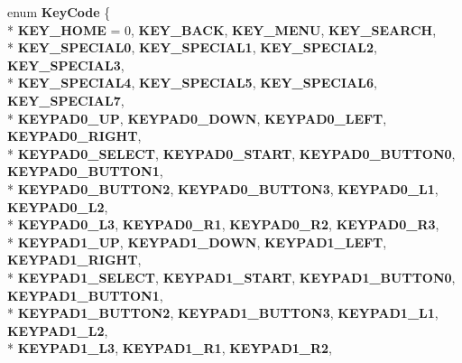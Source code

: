 \begin{DoxyCompactItemize}
\item 
enum {\bfseries Key\+Code} \{ \\*
{\bfseries K\+E\+Y\+\_\+\+H\+O\+ME} = 0, 
{\bfseries K\+E\+Y\+\_\+\+B\+A\+CK}, 
{\bfseries K\+E\+Y\+\_\+\+M\+E\+NU}, 
{\bfseries K\+E\+Y\+\_\+\+S\+E\+A\+R\+CH}, 
\\*
{\bfseries K\+E\+Y\+\_\+\+S\+P\+E\+C\+I\+A\+L0}, 
{\bfseries K\+E\+Y\+\_\+\+S\+P\+E\+C\+I\+A\+L1}, 
{\bfseries K\+E\+Y\+\_\+\+S\+P\+E\+C\+I\+A\+L2}, 
{\bfseries K\+E\+Y\+\_\+\+S\+P\+E\+C\+I\+A\+L3}, 
\\*
{\bfseries K\+E\+Y\+\_\+\+S\+P\+E\+C\+I\+A\+L4}, 
{\bfseries K\+E\+Y\+\_\+\+S\+P\+E\+C\+I\+A\+L5}, 
{\bfseries K\+E\+Y\+\_\+\+S\+P\+E\+C\+I\+A\+L6}, 
{\bfseries K\+E\+Y\+\_\+\+S\+P\+E\+C\+I\+A\+L7}, 
\\*
{\bfseries K\+E\+Y\+P\+A\+D0\+\_\+\+UP}, 
{\bfseries K\+E\+Y\+P\+A\+D0\+\_\+\+D\+O\+WN}, 
{\bfseries K\+E\+Y\+P\+A\+D0\+\_\+\+L\+E\+FT}, 
{\bfseries K\+E\+Y\+P\+A\+D0\+\_\+\+R\+I\+G\+HT}, 
\\*
{\bfseries K\+E\+Y\+P\+A\+D0\+\_\+\+S\+E\+L\+E\+CT}, 
{\bfseries K\+E\+Y\+P\+A\+D0\+\_\+\+S\+T\+A\+RT}, 
{\bfseries K\+E\+Y\+P\+A\+D0\+\_\+\+B\+U\+T\+T\+O\+N0}, 
{\bfseries K\+E\+Y\+P\+A\+D0\+\_\+\+B\+U\+T\+T\+O\+N1}, 
\\*
{\bfseries K\+E\+Y\+P\+A\+D0\+\_\+\+B\+U\+T\+T\+O\+N2}, 
{\bfseries K\+E\+Y\+P\+A\+D0\+\_\+\+B\+U\+T\+T\+O\+N3}, 
{\bfseries K\+E\+Y\+P\+A\+D0\+\_\+\+L1}, 
{\bfseries K\+E\+Y\+P\+A\+D0\+\_\+\+L2}, 
\\*
{\bfseries K\+E\+Y\+P\+A\+D0\+\_\+\+L3}, 
{\bfseries K\+E\+Y\+P\+A\+D0\+\_\+\+R1}, 
{\bfseries K\+E\+Y\+P\+A\+D0\+\_\+\+R2}, 
{\bfseries K\+E\+Y\+P\+A\+D0\+\_\+\+R3}, 
\\*
{\bfseries K\+E\+Y\+P\+A\+D1\+\_\+\+UP}, 
{\bfseries K\+E\+Y\+P\+A\+D1\+\_\+\+D\+O\+WN}, 
{\bfseries K\+E\+Y\+P\+A\+D1\+\_\+\+L\+E\+FT}, 
{\bfseries K\+E\+Y\+P\+A\+D1\+\_\+\+R\+I\+G\+HT}, 
\\*
{\bfseries K\+E\+Y\+P\+A\+D1\+\_\+\+S\+E\+L\+E\+CT}, 
{\bfseries K\+E\+Y\+P\+A\+D1\+\_\+\+S\+T\+A\+RT}, 
{\bfseries K\+E\+Y\+P\+A\+D1\+\_\+\+B\+U\+T\+T\+O\+N0}, 
{\bfseries K\+E\+Y\+P\+A\+D1\+\_\+\+B\+U\+T\+T\+O\+N1}, 
\\*
{\bfseries K\+E\+Y\+P\+A\+D1\+\_\+\+B\+U\+T\+T\+O\+N2}, 
{\bfseries K\+E\+Y\+P\+A\+D1\+\_\+\+B\+U\+T\+T\+O\+N3}, 
{\bfseries K\+E\+Y\+P\+A\+D1\+\_\+\+L1}, 
{\bfseries K\+E\+Y\+P\+A\+D1\+\_\+\+L2}, 
\\*
{\bfseries K\+E\+Y\+P\+A\+D1\+\_\+\+L3}, 
{\bfseries K\+E\+Y\+P\+A\+D1\+\_\+\+R1}, 
{\bfseries K\+E\+Y\+P\+A\+D1\+\_\+\+R2}, 

\end{DoxyCompactItemize}
